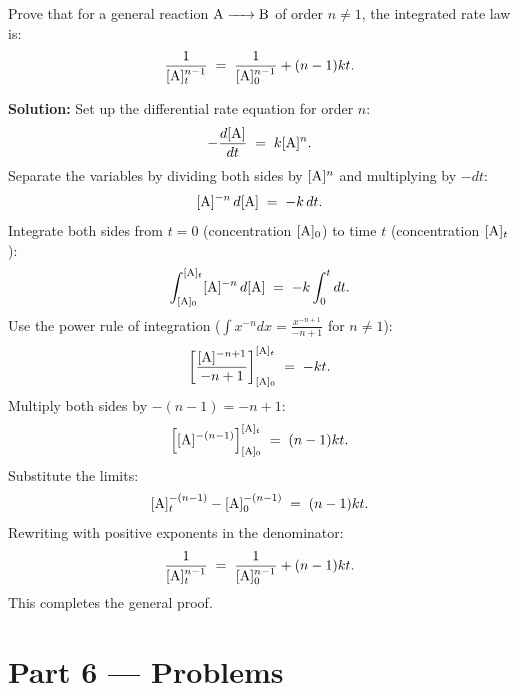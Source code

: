 \documentclass[12pt, a4paper]{book}
\begin{document}
\begin{problembox}
\begin{enumerate}[label=\textbf{E\arabic*.}]
        Prove that for a general reaction $\ce{A -> B}$ of order $n \neq 1$, the integrated rate law is:
        \[
          \frac{1}{[\ce{A}]_t^{n-1}} \;=\; \frac{1}{[\ce{A}]_0^{n-1}} + (n-1)kt.
        \]
        
        \textbf{Solution:}
        Set up the differential rate equation for order $n$:
        \[
          -\frac{d[\ce{A}]}{dt} \;=\; k[\ce{A}]^n.
        \]
        Separate the variables by dividing both sides by $[\ce{A}]^n$ and multiplying by $-dt$:
        \[
          [\ce{A}]^{-n} \, d[\ce{A}] \;=\; -k \, dt.
        \]
        Integrate both sides from $t=0$ (concentration $[\ce{A}]_0$) to time $t$ (concentration $[\ce{A}]_t$):
        \[
          \int_{[\ce{A}]_0}^{[\ce{A}]_t} [\ce{A}]^{-n} \, d[\ce{A}] \;=\; -k \int_0^t dt.
        \]
        Use the power rule of integration ($\int x^{-n} dx = \frac{x^{-n+1}}{-n+1}$ for $n \neq 1$):
        \[
          \left[ \frac{[\ce{A}]^{-n+1}}{-n+1} \right]_{[\ce{A}]_0}^{[\ce{A}]_t} \;=\; -kt.
        \]
        Multiply both sides by $-(n-1) = -n+1$:
        \[
          \left[ [\ce{A}]^{-(n-1)} \right]_{[\ce{A}]_0}^{[\ce{A}]_t} \;=\; (n-1)kt.
        \]
        Substitute the limits:
        \[
          [\ce{A}]_t^{-(n-1)} - [\ce{A}]_0^{-(n-1)} \;=\; (n-1)kt.
        \]
        Rewriting with positive exponents in the denominator:
        \[
          \frac{1}{[\ce{A}]_t^{n-1}} \;=\; \frac{1}{[\ce{A}]_0^{n-1}} + (n-1)kt.
        \]
        This completes the general proof.
\end{enumerate}
\end{problembox}

\newpage

\section{Part 6 --- Problems}
\end{document}
